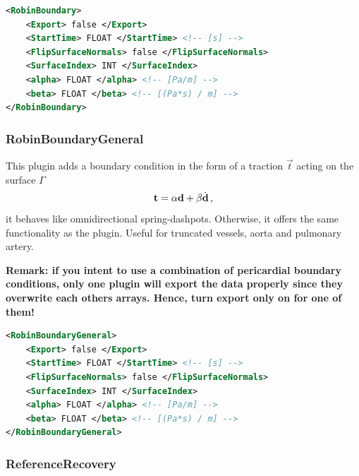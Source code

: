 \begin{lstlisting}[language=XML,caption=.xml settings for the RobinBoundary plugin]
<RobinBoundary>
    <Export> false </Export> 
    <StartTime> FLOAT </StartTime> <!-- [s] -->
    <FlipSurfaceNormals> false </FlipSurfaceNormals>
    <SurfaceIndex> INT </SurfaceIndex>
    <alpha> FLOAT </alpha> <!-- [Pa/m] -->
    <beta> FLOAT </beta> <!-- [(Pa*s) / m] -->
</RobinBoundary>
\end{lstlisting}

\subsubsection{RobinBoundaryGeneral}
\label{plugin:RobinGeneral}

This plugin adds a boundary condition in the form of a traction $\vec t$ acting on the surface $\Gamma$
\begin{equation}
    \vec t = \alpha \d + \beta \dot{\d} \,,
\end{equation}
\ie it behaves like omnidirectional spring-dashpots.
Otherwise, it offers the same functionality as the  plugin.
Useful for truncated vessels, \eg aorta and pulmonary artery.

\textbf{Remark: if you intent to use a combination of pericardial boundary conditions, only one plugin will export the data properly since they overwrite each others arrays. Hence, turn export only on for one of them!}

\begin{lstlisting}[language=XML,caption=.xml settings for the RobinBoundaryGeneral plugin]
<RobinBoundaryGeneral>
    <Export> false </Export> 
    <StartTime> FLOAT </StartTime> <!-- [s] -->
    <FlipSurfaceNormals> false </FlipSurfaceNormals>
    <SurfaceIndex> INT </SurfaceIndex>
    <alpha> FLOAT </alpha> <!-- [Pa/m] -->
    <beta> FLOAT </beta> <!-- [(Pa*s) / m] -->
</RobinBoundaryGeneral>
\end{lstlisting}

\subsubsection{ReferenceRecovery}
\label{plugin:ReferenceRecovery}

